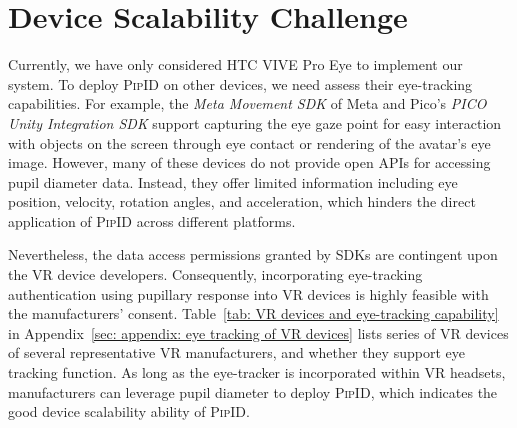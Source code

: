 \documentclass[sigconf]{acmart}
\newcommand{\sysname}{\textsc{PipID}\xspace}
\begin{document}
\section{Device Scalability Challenge}\label{sec: appendix: device scalability}
Currently, we have only considered HTC VIVE Pro Eye to implement our system. To deploy \sysname on other devices, we need assess their eye-tracking capabilities. For example, the \textit{Meta Movement SDK} of Meta and Pico's \textit{PICO Unity Integration SDK} support capturing the eye gaze point for easy interaction with objects on the screen through eye contact or rendering of the avatar's eye image. However, many of these devices do not provide open APIs for accessing pupil diameter data. Instead, they offer limited information including eye position, velocity, rotation angles, and acceleration, which hinders the direct application of \sysname across different platforms. 


Nevertheless, the data access permissions granted by SDKs are contingent upon the VR device developers. Consequently, incorporating eye-tracking authentication using pupillary response into VR devices is highly feasible with the manufacturers' consent. Table~\ref{tab: VR devices and eye-tracking capability} in Appendix~\ref{sec: appendix: eye tracking of VR devices} lists series of VR devices of several representative VR manufacturers, and whether they support eye tracking function. As long as the eye-tracker is incorporated within VR headsets, manufacturers can leverage pupil diameter to deploy \sysname, which indicates the good device scalability ability of \sysname.
\end{document}
